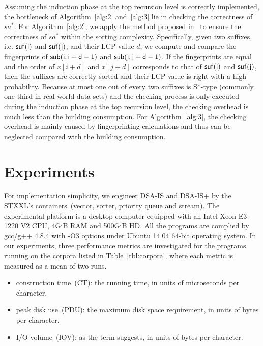\documentclass[10pt,journal,compsoc]{IEEEtran}
\begin{document}
Assuming the induction phase at the top recursion level is correctly implemented, the bottleneck of Algorithm~\ref{alg:2} and~\ref{alg:3} lie in checking the correctness of $sa^*$. For Algorithm~\ref{alg:2}, we apply the method proposed in~\cite{wu2017} to ensure the correctness of $sa^*$ within the sorting complexity. Specifically, given two suffixes, i.e. $\sf suf(i)$ and $\sf suf(j)$, and their LCP-value $d$, we compute and compare the fingerprints of $\sf sub(i, i + d - 1)$ and $\sf sub(j, j + d - 1)$. If the fingerprints are equal and the order of $x[i + d]$ and $x[j + d]$ corresponds to that of $\sf suf(i)$ and $\sf suf(j)$, then the suffixes are correctly sorted and their LCP-value is right with a high probability. Because at most one out of every two suffixes is S*-type (commonly one-third in real-world data sets) and the checking process is only executed during the induction phase at the top recursion level, the checking overhead is much less than the building consumption. For Algorithm~\ref{alg:3}, the checking overhead is mainly caused by fingerprinting calculations and thus can be neglected compared with the building consumption.
 
\section{Experiments} \label{sec:experiments}

For implementation simplicity, we engineer DSA-IS and DSA-IS+ by the STXXL's containers~(vector, sorter, priority queue and stream). The experimental platform is a desktop computer equipped with an Intel Xeon E3-1220 V2 CPU, 4GiB RAM and 500GiB HD. All the programs are complied by gcc/g++ 4.8.4 with -O3 options under Ubuntu 14.04 64-bit operating system. In our experiments, three performance metrics are investigated for the programs running on the corpora listed in Table~\ref{tbl:corpora}, where each metric is measured as a mean of two runs.

\begin{itemize}
	\item construction time~(CT): the running time, in units of microseconds per character.
	\item peak disk use~(PDU): the maximum disk space requirement, in units of bytes per character.
	\item I/O volume~(IOV): as the term suggests, in units of bytes per character.
\end{itemize}
\end{document}
